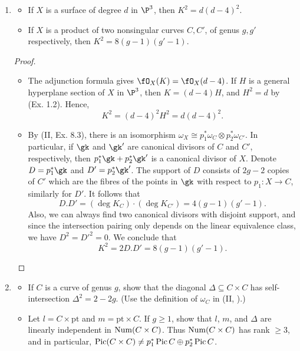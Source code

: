 \documentclass[a4paper]{article}
\begin{document}
\begin{enumerate} [label=\textbf{\arabic*.}, leftmargin=0em]
    \item \begin{itemize}
              \item[(a)] If $X$ is a surface of degree $d$ in $\P^3$, then $K^2 = d(d - 4)^2$.
              \item[(b)] If $X$ is a product of two nonsingular curves $C, C'$, of genus $g, g'$ respectively, then $K^2 = 8(g - 1)(g' - 1)$.
          \end{itemize}

          \begin{proof} $ $ \vspace{0pt}
              \begin{itemize} [leftmargin=0cm]
                  \item[(a)] The adjunction formula gives $\fO_X(K) = \fO_X(d - 4)$.
                        If $H$ is a general hyperplane section of $X$ in $\P^3$, then $K = (d - 4)H$, and $H^2 = d$ by (Ex. 1.2).
                        Hence, $$K^2 = (d - 4)^2H^2 = d(d - 4)^2.$$

                  \item[(b)] By (II, Ex. 8.3), there is an isomorphism $\omega_{X} \cong p_1^*\omega_C \otimes p_2^*\omega_{C'}$.
                        In particular, if $\gk$ and $\gk'$ are canonical divisors of $C$ and $C'$, respectively, then $p_1^*\gk + p_2^*\gk'$ is a canonical divisor of $X$.
                        Denote $D = p_1^*\gk$ and $D' = p_2^*\gk'$.
                        The support of $D$ consists of $2g - 2$ copies of $C'$ which are the fibres of the points in $\gk$ with respect to $p_1 : X \to C$, similarly for $D'$.
                        It follows that
                        \begin{equation*}
                            D.D' = (\deg{K_C}) \cdot (\deg{K_{C'}}) = 4(g - 1)(g' - 1).
                        \end{equation*}
                        Also, we can always find two canonical divisors with disjoint support, and since the intersection pairing only depends on the linear equivalence class, we have $D^2 = D'^2 = 0$.
                        We conclude that $$K^2 = 2D.D' = 8(g - 1)(g' - 1).$$
              \end{itemize}
          \end{proof}

    \item \begin{itemize}
              \item[(a)] If $C$ is a curve of genus $g$, show that the diagonal $\Delta \subseteq C \times C$ has self-intersection $\Delta^2 = 2 - 2g$. (Use the definition of $\omega_C$ in (II, ).)
              \item[(b)] Let $l = C \times \text{pt}$ and $m = \text{pt} \times C$.
                    If $g \geq 1$, show that $l$, $m$, and $\Delta$ are linearly independent in $\operatorname{Num}(C \times C)$.
                    Thus $\operatorname{Num}(C \times C)$ has rank $\geq 3$, and in particular, $\operatorname{Pic}(C \times C) \neq p_1^*\operatorname{Pic}{C} \oplus p_2^*\operatorname{Pic}{C}$.
          \end{itemize}


\end{enumerate}
\end{document}
